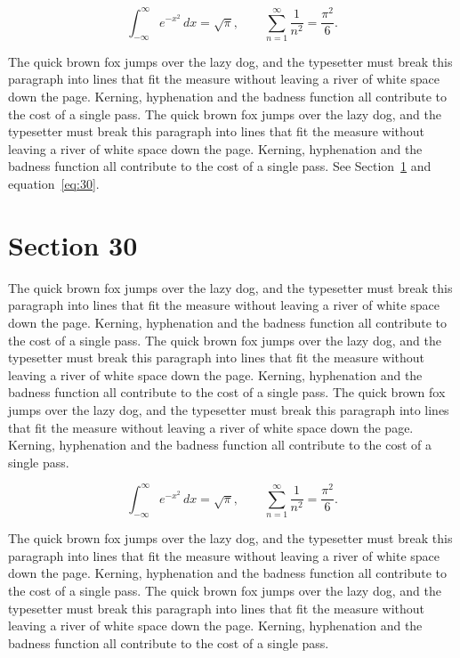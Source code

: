 \documentclass{article}
\begin{document}
\begin{equation}\label{eq:29}
\int_{-\infty}^{\infty} e^{-x^{2}}\,dx = \sqrt{\pi}, \qquad
\sum_{n=1}^{\infty} \frac{1}{n^{2}} = \frac{\pi^{2}}{6}.
\end{equation}

The quick brown fox jumps over the lazy dog, and the typesetter must break this paragraph into lines that fit the measure without leaving a river of white space down the page. Kerning, hyphenation and the badness function all contribute to the cost of a single pass. The quick brown fox jumps over the lazy dog, and the typesetter must break this paragraph into lines that fit the measure without leaving a river of white space down the page. Kerning, hyphenation and the badness function all contribute to the cost of a single pass. 
See Section~\ref{sec:30} and equation~\eqref{eq:30}.
\section{Section 30}
\label{sec:30}
The quick brown fox jumps over the lazy dog, and the typesetter must break this paragraph into lines that fit the measure without leaving a river of white space down the page. Kerning, hyphenation and the badness function all contribute to the cost of a single pass. The quick brown fox jumps over the lazy dog, and the typesetter must break this paragraph into lines that fit the measure without leaving a river of white space down the page. Kerning, hyphenation and the badness function all contribute to the cost of a single pass. The quick brown fox jumps over the lazy dog, and the typesetter must break this paragraph into lines that fit the measure without leaving a river of white space down the page. Kerning, hyphenation and the badness function all contribute to the cost of a single pass. 

\begin{equation}\label{eq:30}
\int_{-\infty}^{\infty} e^{-x^{2}}\,dx = \sqrt{\pi}, \qquad
\sum_{n=1}^{\infty} \frac{1}{n^{2}} = \frac{\pi^{2}}{6}.
\end{equation}

The quick brown fox jumps over the lazy dog, and the typesetter must break this paragraph into lines that fit the measure without leaving a river of white space down the page. Kerning, hyphenation and the badness function all contribute to the cost of a single pass. The quick brown fox jumps over the lazy dog, and the typesetter must break this paragraph into lines that fit the measure without leaving a river of white space down the page. Kerning, hyphenation and the badness function all contribute to the cost of a single pass. 
\end{document}
